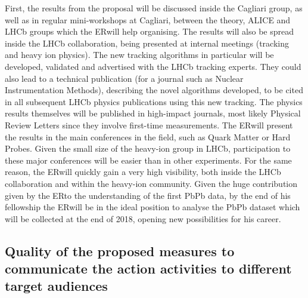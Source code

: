 \documentclass[a4paper,11pt]{article}
\newcommand{\ER}{ER}
\begin{document}
First, the results from the proposal will be discussed inside the
Cagliari group, as well as in regular mini-workshops at Cagliari, 
between the theory, ALICE and LHCb groups which the \ER will
help organising. The results will also be
spread inside the LHCb collaboration, being presented at internal
meetings (tracking and heavy ion physics). The new tracking algorithms
in particular will be developed, validated and advertised with the
LHCb tracking experts. They could also lead to a technical publication
(for a journal such as Nuclear Instrumentation Methods), describing
the novel algorithms developed, to be cited in all subsequent LHCb
physics publications using this new tracking. The physics results
themselves will be published in high-impact journals, most likely
Physical Review Letters since they involve first-time
measurements. The \ER will present the results in the main conferences in the
field, such as Quark Matter or Hard Probes. Given
the small size of the heavy-ion group in LHCb, participation to these
major conferences will be easier than in other experiments. For the
same reason, the \ER will quickly gain a very high visibility, both
inside the LHCb collaboration and within the heavy-ion community.
Given the huge contribution given by the \ER to the understanding of the 
first PbPb data, by the end of his fellowship the \ER will be in the 
ideal position to analyse the PbPb dataset which will be collected
at the end of 2018, opening new possibilities for his 
career. 



%           

\subsection{Quality of the proposed measures to communicate the action activities to different target audiences }
% 
% 
\end{document}
